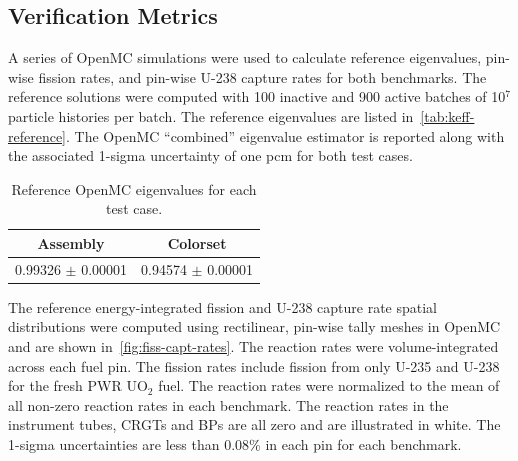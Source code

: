 \subsection{Verification Metrics}
\label{subsec:metrics}

A series of OpenMC simulations were used to calculate reference eigenvalues, pin-wise fission rates, and pin-wise U-238 capture rates for both benchmarks. The reference solutions were computed with 100 inactive and 900 active batches of 10$^7$ particle histories per batch. The reference eigenvalues are listed in~\autoref{tab:keff-reference}. The OpenMC ``combined'' eigenvalue estimator is reported along with the associated 1-sigma uncertainty of one pcm for both test cases.


\begin{table}[h!]
  \centering
  \caption{Reference OpenMC eigenvalues for each test case.}
  \label{tab:keff-reference} 
  \begin{tabular}{c c}
  \toprule
  {\bf Assembly} &
  {\bf Colorset} \\
  \midrule
  0.99326 $\pm$ 0.00001 & 0.94574 $\pm$ 0.00001 \\
  \bottomrule
\end{tabular}
\end{table}

The reference energy-integrated fission and U-238 capture rate spatial distributions were computed using rectilinear, pin-wise tally meshes in OpenMC and are shown in~\autoref{fig:fiss-capt-rates}. The reaction rates were volume-integrated across each fuel pin. The fission rates include fission from only U-235 and U-238 for the fresh PWR UO$_2$ fuel. The reaction rates were normalized to the mean of all non-zero reaction rates in each benchmark. The reaction rates in the instrument tubes, CRGTs and BPs are all zero and are illustrated in white. The 1-sigma uncertainties are less than 0.08\% in each pin for each benchmark.


